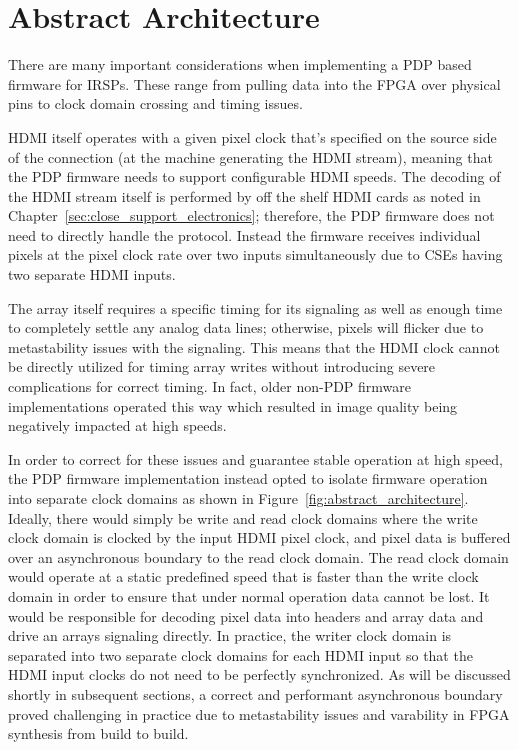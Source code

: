 \section{Abstract Architecture}
    There are many important considerations when implementing a PDP based firmware for IRSPs. These range from pulling data into the FPGA over physical pins to clock domain crossing and timing issues.

    HDMI itself operates with a given pixel clock that's specified on the source side of the connection (at the machine generating the HDMI stream), meaning that the PDP firmware needs to support configurable HDMI speeds. The decoding of the HDMI stream itself is performed by off the shelf HDMI cards as noted in Chapter~\ref{sec:close_support_electronics}; therefore, the PDP firmware does not need to directly handle the protocol. Instead the firmware receives individual pixels at the pixel clock rate over two inputs simultaneously due to CSEs having two separate HDMI inputs.

    The array itself requires a specific timing for its signaling as well as enough time to completely settle any analog data lines; otherwise, pixels will flicker due to metastability issues with the signaling. This means that the HDMI clock cannot be directly utilized for timing array writes without introducing severe complications for correct timing. In fact, older non-PDP firmware implementations operated this way which resulted in image quality being negatively impacted at high speeds.

    In order to correct for these issues and guarantee stable operation at high speed, the PDP firmware implementation instead opted to isolate firmware operation into separate clock domains as shown in Figure~\ref{fig:abstract_architecture}. Ideally, there would simply be write and read clock domains where the write clock domain is clocked by the input HDMI pixel clock, and pixel data is buffered over an asynchronous boundary to the read clock domain. The read clock domain would operate at a static predefined speed that is faster than the write clock domain in order to ensure that under normal operation data cannot be lost. It would be responsible for decoding pixel data into headers and array data and drive an arrays signaling directly. In practice, the writer clock domain is separated into two separate clock domains for each HDMI input so that the HDMI input clocks do not need to be perfectly synchronized. As will be discussed shortly in subsequent sections, a correct and performant asynchronous boundary proved challenging in practice due to metastability issues and varability in FPGA synthesis from build to build.

